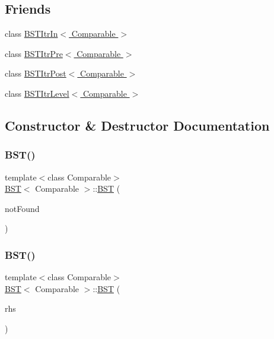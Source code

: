 \subsection*{Friends}
\begin{DoxyCompactItemize}
\item 
class \hyperlink{classBST_aab3993acac2ab24a0b59edb0c3acc775}{B\+S\+T\+Itr\+In$<$ Comparable $>$}
\item 
class \hyperlink{classBST_a45a55df6f11541416d4ea7684c575c1a}{B\+S\+T\+Itr\+Pre$<$ Comparable $>$}
\item 
class \hyperlink{classBST_a5dc153694be266f6e772659486219da7}{B\+S\+T\+Itr\+Post$<$ Comparable $>$}
\item 
class \hyperlink{classBST_a26ff00bc0d87069aed877f10fd3c80a8}{B\+S\+T\+Itr\+Level$<$ Comparable $>$}
\end{DoxyCompactItemize}


\subsection{Constructor \& Destructor Documentation}
\mbox{\label{classBST_a3185a79cf472271f122a97d0f59022d1}} 
\subsubsection{\texorpdfstring{B\+S\+T()}{BST()}\hspace{0.1cm}{\footnotesize\ttfamily [1/2]}}
{\footnotesize\ttfamily template$<$class Comparable$>$ \\
\hyperlink{classBST}{B\+ST}$<$ Comparable $>$\+::\hyperlink{classBST}{B\+ST} (\begin{DoxyParamCaption}\item[{const Comparable \&}]{not\+Found }\end{DoxyParamCaption})\hspace{0.3cm}{\ttfamily [explicit]}}

\mbox{\label{classBST_a163232cc6ffcbd1a51707efcc3fa36ca}} 
\subsubsection{\texorpdfstring{B\+S\+T()}{BST()}\hspace{0.1cm}{\footnotesize\ttfamily [2/2]}}
{\footnotesize\ttfamily template$<$class Comparable$>$ \\
\hyperlink{classBST}{B\+ST}$<$ Comparable $>$\+::\hyperlink{classBST}{B\+ST} (\begin{DoxyParamCaption}\item[{const \hyperlink{classBST}{B\+ST}$<$ Comparable $>$ \&}]{rhs }\end{DoxyParamCaption})}

